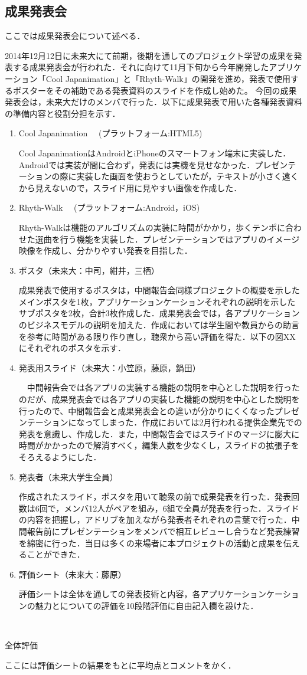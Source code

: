 \subsection{成果発表会}
\par
ここでは成果発表会について述べる．
\par
 2014年12月12日に未来大にて前期，後期を通してのプロジェクト学習の成果を発表する成果発表会が行われた．それに向けて11月下旬から今年開発したアプリケーション「Cool Japanimation」と「Rhyth-Walk」の開発を進め，発表で使用するポスターをその補助である発表資料のスライドを作成し始めた。
今回の成果発表会は，未来大だけのメンバで行った．以下に成果発表で用いた各種発表資料の準備内容と役割分担を示す．
\begin{enumerate}
\item Cool Japanimation　 (プラットフォーム:HTML5)
\par
 Cool JapanimationはAndroidとiPhoneのスマートフォン端末に実装した．Androidでは実装が間に合わず，発表には実機を見せなかった．プレゼンテーションの際に実装した画面を使おうとしていたが，テキストが小さく遠くから見えないので，スライド用に見やすい画像を作成した．
\par
\item Rhyth-Walk　 (プラットフォーム:Android，iOS)
\par
 Rhyth-Walkは機能のアルゴリズムの実装に時間がかかり，歩くテンポに合わせた選曲を行う機能を実装した．プレゼンテーションではアプリのイメージ映像を作成し、分かりやすい発表を目指した．
\item ポスタ（未来大：中司，紺井，三栖）
\par
 成果発表で使用するポスタは，中間報告会同様プロジェクトの概要を示したメインポスタを1枚，アプリケーションケーションそれぞれの説明を示したサブポスタを2枚，合計3枚作成した．成果発表会では，各アプリケーションのビジネスモデルの説明を加えた．作成においては学生間や教員からの助言を参考に時間がある限り作り直し，聴衆から高い評価を得た．以下の図XXにそれぞれのポスタを示す． 
\item 発表用スライド（未来大：小笠原，藤原，鍋田）
\par
　中間報告会では各アプリの実装する機能の説明を中心とした説明を行ったのだが、成果発表会では各アプリの実装した機能の説明を中心とした説明を行ったので、中間報告会と成果発表会との違いが分かりにくくなったプレゼンテーションになってしまった．作成においては2月行われる提供企業先での発表を意識し、作成した．また，中間報告会ではスライドのマージに膨大に時間がかかったので解消すべく，編集人数を少なくし，スライドの拡張子をそろえるようにした． \item 発表者（未来大学生全員）
\par
作成されたスライド，ポスタを用いて聴衆の前で成果発表を行った．発表回数は6回で，メンバ12人がペアを組み，6組で全員が発表を行った．スライドの内容を把握し，アドリブを加えながら発表者それぞれの言葉で行った．中間報告前にプレゼンテーションをメンバで相互レビューし合うなど発表練習を綿密に行った．当日は多くの来場者に本プロジェクトの活動と成果を伝えることができた．
\item 評価シート（未来大：藤原）
\par
評価シートは全体を通しての発表技術と内容，各アプリケーションケーションの魅力とについての評価を10段階評価に自由記入欄を設けた．

\end{enumerate}　
\par
全体評価
\par
ここには評価シートの結果をもとに平均点とコメントをかく．
